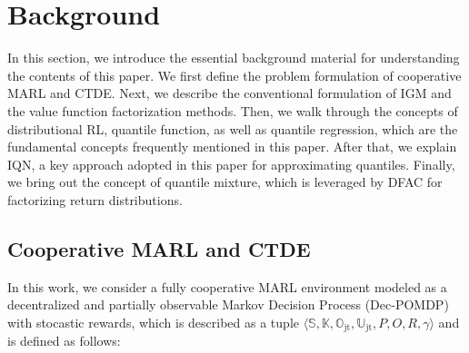 \documentclass[twoside,11pt]{article}
\newcommand{\statespace}{\mathbb{S}}
\newcommand{\jointactionspace}{\mathbb{U}}
\newcommand{\statetransitionfunction}{P}
\newcommand{\rewardfunction}{R}
\newcommand{\jointobservationspace}{\mathbb{O}}
\newcommand{\observationfunction}{O}
\newcommand{\agentspace}{\mathbb{K}}
\newcommand{\discountfactor}{\gamma}
\newcommand{\joint}{\mathrm{jt}}
\begin{document}
 \section{Background}
\label{sec:background}

In this section, we introduce the essential background material for understanding the contents of this paper. We first define the problem formulation of cooperative MARL and CTDE. Next, we describe the conventional formulation of IGM and the value function factorization methods. Then, we walk through the concepts of distributional RL, quantile function, as well as quantile regression, which are the fundamental concepts frequently mentioned in this paper. After that, we explain IQN, a key approach adopted in this paper for approximating quantiles.  Finally, we bring out the concept of quantile mixture, which is leveraged by DFAC for factorizing return distributions.


\subsection{Cooperative MARL and CTDE}
\label{subsec:background_cooperative_marl_and_ctde}

In this work, we consider a fully cooperative MARL environment modeled as a decentralized and partially observable Markov Decision Process (Dec-POMDP)~\citep{Oliehoek2016CTDE} with stocastic rewards, which is described as a tuple $\langle\statespace{},\agentspace{},\jointobservationspace_{\joint},\jointactionspace_{\joint},\statetransitionfunction{},\observationfunction{},\rewardfunction{},\discountfactor{}\rangle$ and is defined as follows:
\end{document}
